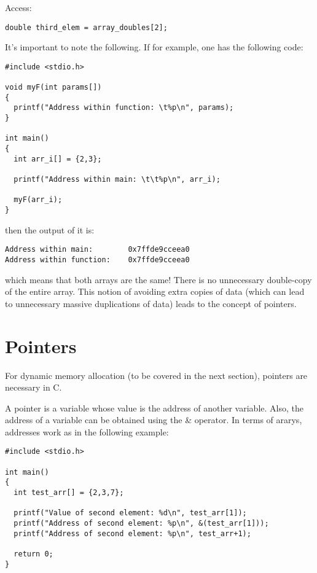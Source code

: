 \documentclass[11pt]{article}
\begin{document}
Access:

\begin{lstlisting}[numbers=none]
double third_elem = array_doubles[2];
\end{lstlisting}

It's important to note the following. If for example, one has the following code:

\begin{lstlisting}
#include <stdio.h>

void myF(int params[])
{
  printf("Address within function: \t%p\n", params);
}

int main()
{
  int arr_i[] = {2,3};

  printf("Address within main: \t\t%p\n", arr_i);

  myF(arr_i);
}
\end{lstlisting}

then the output of it is:

\begin{lstlisting}[numbers=none]
Address within main: 		0x7ffde9cceea0
Address within function: 	0x7ffde9cceea0
\end{lstlisting}

which means that both arrays are the same! There is no unnecessary double-copy of the entire array. This notion of avoiding extra copies of data (which can lead to unnecessary massive duplications of data) leads to the concept of pointers.


\section{Pointers}

For dynamic memory allocation (to be covered in the next section), pointers are necessary in C.

A pointer is a variable whose value is the address of another variable. Also, the address of a variable can be obtained using the \& operator. In terms of ararys, addresses work as in the following example:


\begin{lstlisting}
#include <stdio.h>

int main()
{
  int test_arr[] = {2,3,7};

  printf("Value of second element: %d\n", test_arr[1]);
  printf("Address of second element: %p\n", &(test_arr[1]));
  printf("Address of second element: %p\n", test_arr+1);

  return 0;
}
\end{lstlisting}
\end{document}
